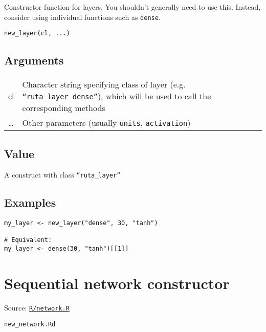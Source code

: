 Constructor function for layers. You shouldn't generally need to use
this. Instead, consider using individual functions such as
\texttt{dense}.

\begin{verbatim}
new_layer(cl, ...)
\end{verbatim}

\hypertarget{arguments}{\subsection{\texorpdfstring{\protect\hyperlink{arguments}{}Arguments}{Arguments}}\label{arguments}}

\begin{longtable}[c]{@{}>{\small}p{3cm}>{\raggedright}p{12.5cm}@{}}
\toprule
cl & Character string specifying class of layer (e.g.
\texttt{``ruta\_layer\_dense''}), which will be used to call the
corresponding methods\tabularnewline
\ldots{} & Other parameters (usually \texttt{units},
\texttt{activation})\tabularnewline
\bottomrule
\end{longtable}

\hypertarget{value}{\subsection{\texorpdfstring{\protect\hyperlink{value}{}Value}{Value}}\label{value}}

A construct with class \texttt{``ruta\_layer''}

\hypertarget{examples}{\subsection{\texorpdfstring{\protect\hyperlink{examples}{}Examples}{Examples}}\label{examples}}

\begin{verbatim}
my_layer <- new_layer("dense", 30, "tanh")

# Equivalent:
my_layer <- dense(30, "tanh")[[1]]
\end{verbatim}

\section{Sequential network
constructor}\label{sequential-network-constructor}

Source:
\href{https://github.com/fdavidcl/ruta/blob/master/R/network.R}{\texttt{R/network.R}}

\texttt{new\_network.Rd}

